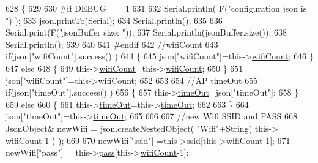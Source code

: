 \begin{DoxyCode}
628         \{
629         
630 \textcolor{preprocessor}{        #if DEBUG == 1 }
631         
632             Serial.println( F(\textcolor{stringliteral}{"configuration json is "}) );
633             json.printTo(Serial);
634             Serial.println();
635 
636             Serial.print(F(\textcolor{stringliteral}{"jsonBuffer size: "}));
637             Serial.println(jsonBuffer.size());
638             Serial.println();
639 
640 
641 \textcolor{preprocessor}{        #endif}
642             \textcolor{comment}{//wifiCount}
643             \textcolor{keywordflow}{if}(json[\textcolor{stringliteral}{"wifiCount"}].success() )
644             \{           
645                 json[\textcolor{stringliteral}{"wifiCount"}]=this->\hyperlink{class_cool_wifi_ab133bd92fcb895b884deecd6678592e4}{wifiCount};
646             \}
647             \textcolor{keywordflow}{else}
648             \{
649                 this->\hyperlink{class_cool_wifi_ab133bd92fcb895b884deecd6678592e4}{wifiCount}=this->\hyperlink{class_cool_wifi_ab133bd92fcb895b884deecd6678592e4}{wifiCount};
650             \}
651             json[\textcolor{stringliteral}{"wifiCount"}]=this->\hyperlink{class_cool_wifi_ab133bd92fcb895b884deecd6678592e4}{wifiCount};
652 
653             
654             \textcolor{comment}{//AP timeOut}
655             \textcolor{keywordflow}{if}(json[\textcolor{stringliteral}{"timeOut"}].success() )
656             \{
657                 this->\hyperlink{class_cool_wifi_a952111605f25156588b5632caaba1c6f}{timeOut}=json[\textcolor{stringliteral}{"timeOut"}];
658             \}
659             \textcolor{keywordflow}{else}
660             \{
661                 this->\hyperlink{class_cool_wifi_a952111605f25156588b5632caaba1c6f}{timeOut}=this->\hyperlink{class_cool_wifi_a952111605f25156588b5632caaba1c6f}{timeOut};
662 
663             \}
664             json[\textcolor{stringliteral}{"timeOut"}]=this->\hyperlink{class_cool_wifi_a952111605f25156588b5632caaba1c6f}{timeOut};
665             
666             
667             \textcolor{comment}{//new Wifi SSID and PASS}
668             JsonObject& newWifi = json.createNestedObject( \textcolor{stringliteral}{"Wifi"}+String( this->
      \hyperlink{class_cool_wifi_ab133bd92fcb895b884deecd6678592e4}{wifiCount}-1 ) );
669             
670             newWifi[\textcolor{stringliteral}{"ssid"}] =this->\hyperlink{class_cool_wifi_a893b21d0fed821438733bba2e73fb4c2}{ssid}[this->\hyperlink{class_cool_wifi_ab133bd92fcb895b884deecd6678592e4}{wifiCount}-1];
671             newWifi[\textcolor{stringliteral}{"pass"}] = this->\hyperlink{class_cool_wifi_a0c3332a149245aaad060b32593a54c9b}{pass}[this->\hyperlink{class_cool_wifi_ab133bd92fcb895b884deecd6678592e4}{wifiCount}-1];

\end{DoxyCode}
